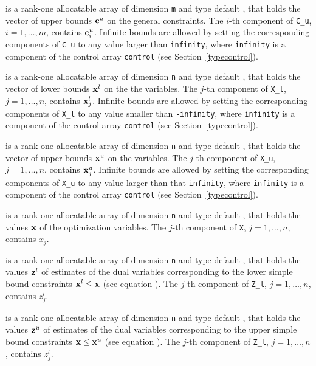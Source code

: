\documentclass{galahad}
\begin{document}
\begin{description}
 is a rank-one allocatable array of dimension {\tt m} and type 
default \realdp, that holds the vector of upper bounds ${\mathbf{c}}^{u}$ 
on the general constraints. The $i$-th component of 
{\tt C\_u}, $i = 1,  \ldots ,  m$, contains ${\mathbf{c}}_{i}^{u}$.
Infinite bounds are allowed by setting the corresponding 
components of {\tt C\_u} to any value larger than {\tt infinity}, 
where {\tt infinity} is a component of the control array {\tt control} 
(see Section~\ref{typecontrol}).

 is a rank-one allocatable array of dimension {\tt n} and type 
default \realdp, that holds
the vector of lower bounds ${\mathbf{x}}^{l}$ on the the variables.
The $j$-th component of {\tt X\_l}, $j = 1, \ldots , n$, 
contains ${\mathbf{x}}_{j}^{l}$.
Infinite bounds are allowed by setting the corresponding 
components of {\tt X\_l} to any value smaller than {\tt -infinity}, 
where {\tt infinity} is a component of the control array {\tt control} 
(see Section~\ref{typecontrol}).

 is a rank-one allocatable array of dimension {\tt n} and type 
default \realdp, that holds
the vector of upper bounds ${\mathbf{x}}^{u}$ on the variables.
The $j$-th component of {\tt X\_u}, $j = 1, \ldots , n$, 
contains ${\mathbf{x}}_{j}^{u}$.
Infinite bounds are allowed by setting the corresponding 
components of {\tt X\_u} to any value larger than that {\tt infinity}, 
where {\tt infinity} is a component of the control array {\tt control} 
(see Section~\ref{typecontrol}).

 is a rank-one allocatable array of dimension {\tt n} and type 
default \realdp, 
that holds the values ${\mathbf{x}}$ of the optimization variables.
The $j$-th component of {\tt X}, $j = 1,  \ldots , n$, contains $x_{j}$.  

 is a rank-one allocatable array of dimension {\tt n} and type default 
\realdp, that holds
the values ${\mathbf{z}}^{l}$ of estimates  of the dual variables 
corresponding to the lower simple bound constraints ${\mathbf{x}}^{l} \leq {\mathbf{x}}$
(see equation ).
The $j$-th component of {\tt Z\_l}, $j = 1,  \ldots ,  n$, 
contains $z_{j}^{l}$.  

 is a rank-one allocatable array of dimension {\tt n} and type default 
\realdp, that holds
the values ${\mathbf{z}}^{u}$ of estimates  of the dual variables 
corresponding to the upper simple bound constraints ${\mathbf{x}} \leq {\mathbf{x}}^{u}$
(see equation ).
The $j$-th component of {\tt Z\_l}, $j = 1,  \ldots ,  n$, 
contains $z_{j}^{l}$.  


\end{description}
\end{document}
